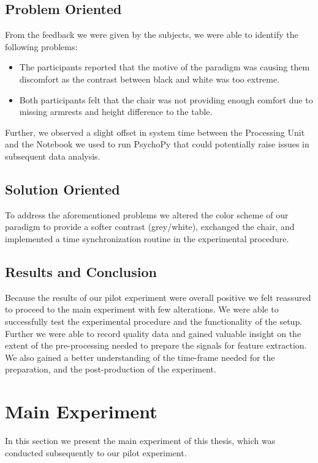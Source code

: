 \subsection{Problem Oriented}\label{po}
From the feedback we were given by the subjects, we were able to identify the following problems:
\begin{itemize}
\item The participants reported that the motive of the paradigm was causing them discomfort as the contrast between black and white was too extreme.
\item Both participants felt that the chair was not providing enough comfort due to missing armrests and height difference to the table. 
\end{itemize}
Further, we observed a slight offset in system time between the Processing Unit and the Notebook we used to run PsychoPy that could potentially raise issues in subsequent data analysis.

\subsection{Solution Oriented}
To address the aforementioned problems we altered the color scheme of our paradigm to provide a softer contrast (grey/white), exchanged the chair, and implemented a time synchronization routine in the experimental procedure.

\subsection{Results and Conclusion}
Because the results of our pilot experiment were overall positive we felt reassured to proceed to the main experiment with few alterations. We were able to successfully test the experimental procedure and the functionality of the setup. Further we were able to record quality data and gained valuable insight on the extent of the pre-processing needed to prepare the signals for feature extraction. We also gained a better understanding of the time-frame needed for the preparation, and the post-production of the experiment.

\section{Main Experiment}
In this section we present the main experiment of this thesis, which was conducted subsequently to our pilot experiment.
